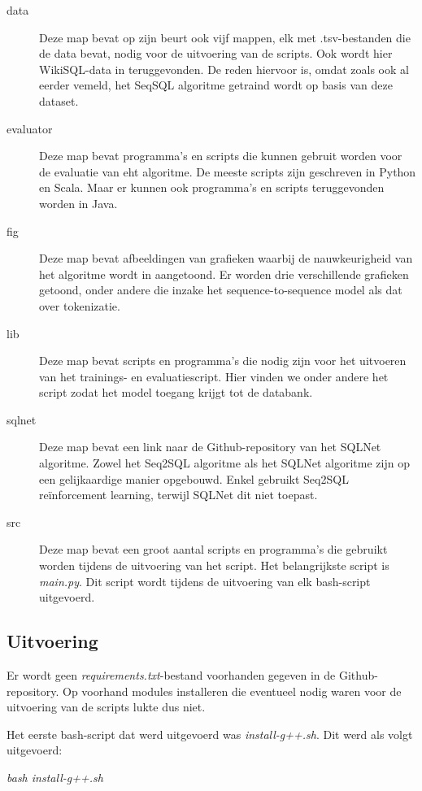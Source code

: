 \begin{description}
	\item[data] Deze map bevat op zijn beurt ook vijf mappen, elk met .tsv-bestanden die de data bevat, nodig voor de uitvoering van de scripts. Ook wordt hier WikiSQL-data in teruggevonden. De reden hiervoor is, omdat zoals ook al eerder vemeld, het SeqSQL algoritme getraind wordt op basis van deze dataset.
	\item[evaluator] Deze map bevat programma's en scripts die kunnen gebruit worden voor de evaluatie van eht algoritme. De meeste scripts zijn geschreven in Python en Scala. Maar er kunnen ook programma's en scripts teruggevonden worden in Java. 
	\item[fig] Deze map bevat afbeeldingen van grafieken waarbij de nauwkeurigheid van het algoritme wordt in aangetoond. Er worden drie verschillende grafieken getoond, onder andere die inzake het sequence-to-sequence model als dat over tokenizatie.
	\item[lib] Deze map bevat scripts en programma's die nodig zijn voor het uitvoeren van het trainings- en evaluatiescript. Hier vinden we onder andere het script zodat het model toegang krijgt tot de databank.
	\item[sqlnet] Deze map bevat een link naar de Github-repository van het SQLNet algoritme. Zowel het Seq2SQL algoritme als het SQLNet algoritme zijn op een gelijkaardige manier opgebouwd. Enkel gebruikt Seq2SQL reïnforcement learning, terwijl SQLNet dit niet toepast.
	\item[src] Deze map bevat een groot aantal scripts en programma's die gebruikt worden tijdens de uitvoering van het script. Het belangrijkste script is \textit{main.py}. Dit script wordt tijdens de uitvoering van elk bash-script uitgevoerd.
\end{description}

\subsection{Uitvoering}

Er wordt geen \textit{requirements.txt}-bestand voorhanden gegeven in de Github-repository. Op voorhand modules installeren die eventueel nodig waren voor de uitvoering van de scripts lukte dus niet. 

Het eerste bash-script dat werd uitgevoerd was \textit{install-g++.sh}. Dit werd als volgt uitgevoerd:

\begin{center}
	\textit{bash install-g++.sh}
\end{center}

